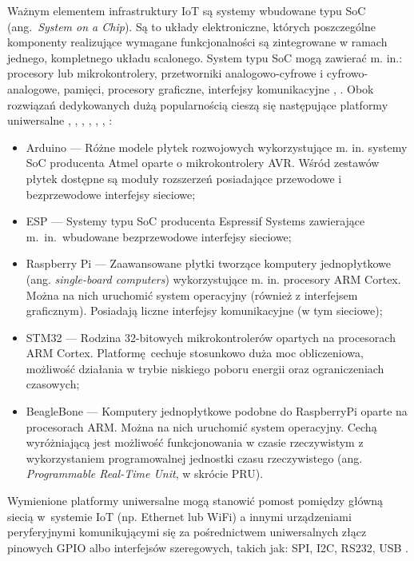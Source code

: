 \documentclass[a4paper, 12pt, twoside]{article}
\begin{document}
Ważnym elementem
infrastruktury IoT są systemy wbudowane typu SoC (ang.~\emph{System on a Chip}).
Są to układy elektroniczne, których poszczególne komponenty realizujące wymagane
funkcjonalności są zintegrowane w ramach jednego, kompletnego układu scalonego.
System typu SoC mogą zawierać m. in.: procesory lub mikrokontrolery, przetworniki
analogowo-cyfrowe i cyfrowo-analogowe, pamięci, procesory graficzne, interfejsy komunikacyjne \cite{intro-to-iot}, \cite{soc}.
Obok rozwiązań dedykowanych dużą popularnością cieszą się następujące platformy uniwersalne \cite{intro-to-iot},
\cite{rpi}, \cite{stm32}, \cite{mikrokontrolery-stm32}, \cite{beaglebone}, \cite{beaglebone-rtu}, \cite{beaglebone-vs-rpi}:
\begin{itemize}
      \itemsep0em
      \item Arduino --- Różne modele płytek rozwojowych wykorzystujące m. in. systemy
            SoC producenta Atmel oparte o mikrokontrolery AVR. Wśród zestawów płytek
            dostępne są moduły rozszerzeń posiadające przewodowe i bezprzewodowe interfejsy sieciowe;
      \item ESP --- Systemy typu SoC producenta Espressif Systems zawierające m.~in.~wbudowane
            bezprzewodowe interfejsy sieciowe;
      \item Raspberry Pi --- Zaawansowane płytki tworzące komputery jednopłytkowe (ang. \emph{single-board computers})
            wykorzystujące m. in. procesory ARM Cortex.
            Można na nich uruchomić system operacyjny (również z interfejsem graficznym). Posiadają liczne
            interfejsy komunikacyjne (w tym sieciowe);
      \item STM32 --- Rodzina 32-bitowych mikrokontrolerów opartych na procesorach
            ARM Cortex. Platformę cechuje stosunkowo duża moc obliczeniowa, możliwość działania w trybie niskiego poboru energii
            oraz ograniczeniach czasowych;
      \item BeagleBone --- Komputery jednopłytkowe podobne do RaspberryPi
            oparte na procesorach ARM. Można na nich uruchomić system operacyjny.
            Cechą wyróżniającą jest możliwość funkcjonowania w czasie rzeczywistym
            z wykorzystaniem programowalnej jednostki czasu rzeczywistego
            (ang. \emph{Programmable Real-Time Unit}, w skrócie PRU).
\end{itemize}
Wymienione platformy uniwersalne mogą stanowić pomost pomiędzy główną siecią w~systemie
IoT (np. Ethernet lub WiFi) a innymi urządzeniami
peryferyjnymi komunikującymi się za pośrednictwem
uniwersalnych złącz pinowych GPIO albo interfejsów szeregowych, takich jak: SPI, I2C, RS232, USB \cite{intro-to-iot}.
\end{document}
